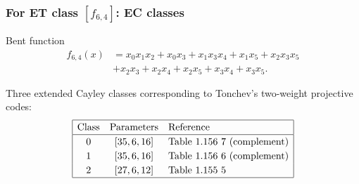 \documentclass[pdf,sprung,slideColor,nocolorBG]{beamer}
\newenvironment{colortheme}[1]{
\def\ProvidesPackageRCS $##1${\relax}
\renewcommand{\ProcessOptions}{\relax}
\makeatletter

\makeatother
}{}
\begin{document}
\begin{colortheme}{jubata}
\begin{frame}
\begin{figure}
\begin{minipage}{.48\textwidth}
  \label{fig:6_3_bent_cayley_graph_index_matrix}
\end{minipage}
\end{figure}
\end{frame}
\begin{frame}
\frametitle{For ET class $[f_{6,4}]$: EC classes}

Bent function
\begin{align*}
f_{6,4}(x) &= x_{0} x_{1} x_{2} + x_{0} x_{3} + x_{1} x_{3} x_{4} + x_{1} x_{5} + x_{2} x_{3} x_{5}
\\
           &+ x_{2} x_{3} + x_{2} x_{4} + x_{2} x_{5} + x_{3} x_{4} + x_{3} x_{5}.
\end{align*}

Three extended Cayley classes corresponding to Tonchev's two-weight projective codes:
\begin{align*}
\def\arraystretch{1.2}
\begin{array}{|ccl|}
\hline
\text{Class} &
\text{Parameters} & \text{Reference}
\\
\hline
0 & [35,6,16] & \text{Table 1.156 7 (complement)}
\\
1 & [35,6,16] & \text{Table 1.156 6 (complement)}
\\
2 & [27,6,12] & \text{Table 1.155 5 }
\\
\hline
\end{array}
\end{align*}


\end{frame}
\end{colortheme}
\end{document}
